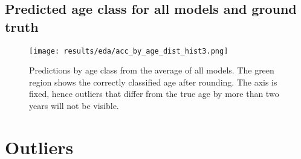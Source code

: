 \documentclass[10pt,letterpaper]{article}
\begin{document}
\pagebreak
\subsection{Predicted age class for all models and ground truth}
\centering
\begin{figure}[ht!]
  \centering
  \texttt{[image: results/eda/acc\_by\_age\_dist\_hist3.png]}
    \caption{Predictions by age class from the average of all models. The green region shows the correctly classified age after rounding. The axis is fixed, hence outliers that differ from the true age by more than two years will not be visible.}
  \label{marker6}    
\end{figure}

\pagebreak

\section{Outliers}
\end{document}
